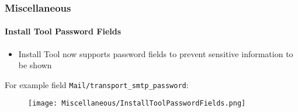 
\begin{frame}[fragile]
	\frametitle{Miscellaneous}
	\framesubtitle{Install Tool Password Fields}

	\begin{itemize}
		\item Install Tool now supports password fields to prevent sensitive
			information to be shown
	\end{itemize}

	\tabto{0.3cm}For example field \texttt{Mail/transport\_smtp\_password}:

	\begin{figure}
		\texttt{[image: Miscellaneous/InstallToolPasswordFields.png]}
	\end{figure}

\end{frame}

